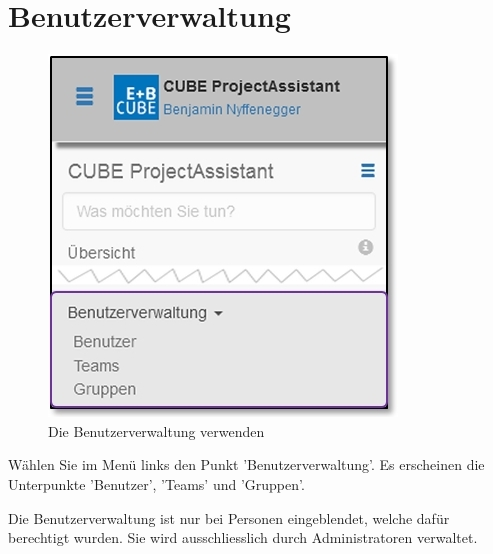 
\clearpage
\section{Benutzerverwaltung}

\begin{figure}   %
  \vspace{-35pt}      %
  \begin{center}
    \includegraphics[width=1\linewidth]{../chapters/14_Benutzerverwaltung/pictures/14_Menu_Benutzerverwaltung.jpg}
  \end{center}
  \vspace{-20pt}
  \caption{Die Benutzerverwaltung verwenden}
  \vspace{-10pt}
\end{figure}

Wählen Sie im Menü links den Punkt 'Benutzerverwaltung'. Es erscheinen die Unterpunkte 'Benutzer', 'Teams' und 'Gruppen'.

\vspace{\baselineskip}

Die Benutzerverwaltung ist nur bei Personen eingeblendet, welche dafür berechtigt wurden. Sie wird ausschliesslich durch Administratoren verwaltet.

